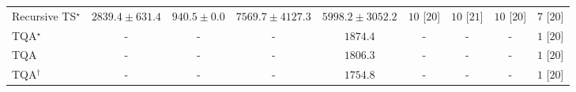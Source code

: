 \begin{tabular}{l|cccc|cccc|}
Recursive TS$^\star$ & {\cellcolor[HTML]{C4CBE3}} \color[HTML]{000000} $2839.4\pm 631.4$ & {\cellcolor[HTML]{FFF7FB}} \color[HTML]{000000} $940.5\pm 0.0$ & {\cellcolor[HTML]{023858}} \color[HTML]{F1F1F1} $7569.7\pm 4127.3$ & {\cellcolor[HTML]{056DAC}} \color[HTML]{F1F1F1} $5998.2\pm 3052.2$ & {\cellcolor[HTML]{49006A}} \color[HTML]{F1F1F1} $10$ [$20$] & {\cellcolor[HTML]{49006A}} \color[HTML]{F1F1F1} $10$ [$21$] & {\cellcolor[HTML]{49006A}} \color[HTML]{F1F1F1} $10$ [$20$] & {\cellcolor[HTML]{CD238F}} \color[HTML]{F1F1F1} $7$ [$20$] \\
TQA$^\star$ & {\cellcolor[HTML]{000000}} \color[HTML]{F1F1F1} {\cellcolor{white}} \color{black} - & {\cellcolor[HTML]{000000}} \color[HTML]{F1F1F1} {\cellcolor{white}} \color{black} - & {\cellcolor[HTML]{000000}} \color[HTML]{F1F1F1} {\cellcolor{white}} \color{black} - & {\cellcolor[HTML]{E8E4F0}} \color[HTML]{000000} $1874.4$ & {\cellcolor[HTML]{000000}} \color[HTML]{F1F1F1} {\cellcolor{white}} \color{black} - & {\cellcolor[HTML]{000000}} \color[HTML]{F1F1F1} {\cellcolor{white}} \color{black} - & {\cellcolor[HTML]{000000}} \color[HTML]{F1F1F1} {\cellcolor{white}} \color{black} - & {\cellcolor[HTML]{FFF7F3}} \color[HTML]{000000} $1$ [$20$] \\
TQA & {\cellcolor[HTML]{000000}} \color[HTML]{F1F1F1} {\cellcolor{white}} \color{black} - & {\cellcolor[HTML]{000000}} \color[HTML]{F1F1F1} {\cellcolor{white}} \color{black} - & {\cellcolor[HTML]{000000}} \color[HTML]{F1F1F1} {\cellcolor{white}} \color{black} - & {\cellcolor[HTML]{EBE6F2}} \color[HTML]{000000} $1806.3$ & {\cellcolor[HTML]{000000}} \color[HTML]{F1F1F1} {\cellcolor{white}} \color{black} - & {\cellcolor[HTML]{000000}} \color[HTML]{F1F1F1} {\cellcolor{white}} \color{black} - & {\cellcolor[HTML]{000000}} \color[HTML]{F1F1F1} {\cellcolor{white}} \color{black} - & {\cellcolor[HTML]{FFF7F3}} \color[HTML]{000000} $1$ [$20$] \\
TQA$^\dagger$ & {\cellcolor[HTML]{000000}} \color[HTML]{F1F1F1} {\cellcolor{white}} \color{black} - & {\cellcolor[HTML]{000000}} \color[HTML]{F1F1F1} {\cellcolor{white}} \color{black} - & {\cellcolor[HTML]{000000}} \color[HTML]{F1F1F1} {\cellcolor{white}} \color{black} - & {\cellcolor[HTML]{EDE7F2}} \color[HTML]{000000} $1754.8$ & {\cellcolor[HTML]{000000}} \color[HTML]{F1F1F1} {\cellcolor{white}} \color{black} - & {\cellcolor[HTML]{000000}} \color[HTML]{F1F1F1} {\cellcolor{white}} \color{black} - & {\cellcolor[HTML]{000000}} \color[HTML]{F1F1F1} {\cellcolor{white}} \color{black} - & {\cellcolor[HTML]{FFF7F3}} \color[HTML]{000000} $1$ [$20$] \\
\cline{1-9}
\bottomrule
\end{tabular}

